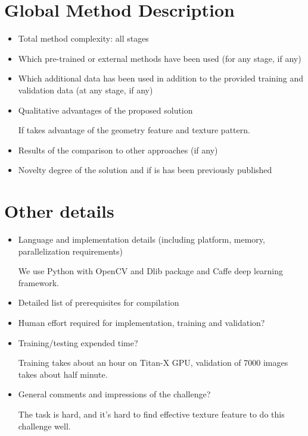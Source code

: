 \documentclass{article}
\begin{document}
\section{Global Method Description}

\begin{itemize}
\item Total method complexity: all stages
\item Which pre-trained or external methods have been used (for any stage, if any)
\item Which additional data has been used in addition to the provided training and validation data (at any stage, if any)
\item Qualitative advantages of the proposed solution

If takes advantage of the geometry feature and texture pattern.
\item Results of the comparison to other approaches (if any)
\item Novelty degree of the solution and if is has been previously published
\end{itemize}

\section{Other details}

\begin{itemize}
\item Language and implementation details (including platform, memory, parallelization requirements)

We use Python with OpenCV and Dlib package and Caffe deep learning framework.
\item Detailed list of prerequisites for compilation
\item Human effort required for implementation, training and validation?
\item Training/testing expended time?

Training takes about an hour on Titan-X GPU, validation of 7000 images takes about half minute.
\item General comments and impressions of the challenge?

The task is hard, and it's hard to find effective texture feature to do this challenge well.

\end{itemize}
\end{document}
